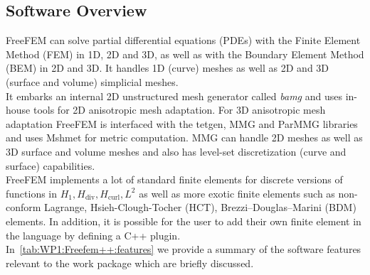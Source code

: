\subsection{Software Overview}
\label{sec:WP1:Freefem++:summary}

FreeFEM can solve partial differential equations (PDEs) with the Finite Element Method (FEM) in 1D, 2D and 3D, as well as with the Boundary Element Method (BEM) in 2D and 3D. It handles 1D (curve) meshes as well as 2D and 3D (surface and volume) simplicial meshes.\\
It embarks an internal 2D unstructured mesh generator called \textit{bamg} and uses in-house tools for 2D anisotropic mesh adaptation. For 3D anisotropic mesh adaptation FreeFEM is interfaced with the tetgen, MMG and ParMMG libraries and uses Mshmet for metric computation. MMG can handle 2D meshes as well as 3D surface and volume meshes and also has level-set discretization (curve and surface) capabilities.\\

FreeFEM implements a lot of standard finite elements for discrete versions of functions in $H_1, H_{\text{div}}, H_{\text{curl}}, L^2$ as well as more exotic finite elements such as non-conform Lagrange, Hsieh-Clough-Tocher (HCT), Brezzi–Douglas–Marini (BDM) elements. In addition, it is possible for the user to add their own finite element in the language by defining a C++ plugin.\\

In~\cref{tab:WP1:Freefem++:features} we provide a summary of the software features relevant to the work package which are briefly discussed.

